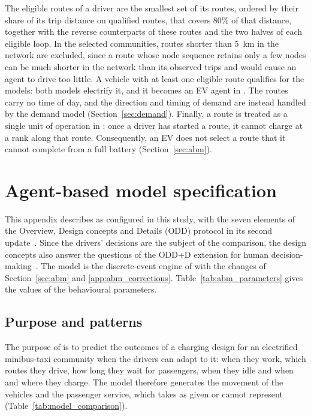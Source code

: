 The eligible routes of a driver are the smallest set of its routes, ordered by their share of its trip distance on qualified routes, that covers 80\% of that distance, together with the reverse counterparts of these routes and the two halves of each eligible loop. In the selected communities, routes shorter than 5~km in the network are excluded, since a route whose node sequence retains only a few nodes can be much shorter in the network than its observed trips and would cause an agent to drive too little. A vehicle with at least one eligible route qualifies for the models: both models electrify it, and it becomes an EV agent in \MA. The routes carry no time of day, and the direction and timing of demand are instead handled by the demand model (Section~\ref{sec:demand}). Finally, a route is treated as a single unit of operation in \MA: once a driver has started a route, it cannot charge at a rank along that route. Consequently, an EV does not select a route that it cannot complete from a full battery (Section~\ref{sec:abm}).

\section{Agent-based model specification}
\label{app:abm}

This appendix describes \MA{} as configured in this study, with the seven elements of the Overview, Design concepts and Details (ODD) protocol in its second update~\cite{grimm2020_odd_second_update}. Since the drivers' decisions are the subject of the comparison, the design concepts also answer the questions of the ODD+D extension for human decision-making~\cite{muller2013_odd_d}. The model is the discrete-event engine of \citet{sello2025_stellenbosch_embt_abm} with the changes of Section~\ref{sec:abm} and \ref{app:abm_corrections}. Table~\ref{tab:abm_parameters} gives the values of the behavioural parameters.

\subsection{Purpose and patterns}
\label{app:abm_purpose}

The purpose of \MA{} is to predict the outcomes of a charging design for an electrified minibus-taxi community when the drivers can adapt to it: when they work, which routes they drive, how long they wait for passengers, when they idle and when and where they charge. The model therefore generates the movement of the vehicles and the passenger service, which \MR{} takes as given or cannot represent (Table~\ref{tab:model_comparison}).

